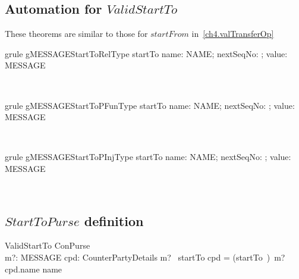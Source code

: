\subsection*{Automation for $ValidStartTo$}

These theorems are similar to those for $startFrom$ in~\ref{ch4.valTransferOp}
%
\begin{LGRT}
\begin{theorem}{grule gMESSAGEStartToRelType}
   startTo \in  \lblot name: NAME; nextSeqNo: \nat ; value: \nat \rblot  \rel  MESSAGE
\end{theorem}~\end{LGRT}

\begin{LGRT}
\begin{theorem}{grule gMESSAGEStartToPFunType}
   startTo \in  \lblot name: NAME; nextSeqNo: \nat ; value: \nat \rblot  \pfun  MESSAGE
\end{theorem}~\end{LGRT}

\begin{LGRT}
\begin{theorem}{grule gMESSAGEStartToPInjType}
   startTo \in \lblot name: NAME; nextSeqNo: \nat; value: \nat \rblot \pinj MESSAGE
\end{theorem}~\end{LGRT}

\subsection*{$StartToPurse$ definition}

\begin{LSDef}
\begin{schema}{ValidStartTo}
   ConPurse \\
   m?: MESSAGE
   \also
   cpd: CounterPartyDetails
\where
   m? \in \ran~startTo
   \also
   cpd = (startTo~\inv)~m?
   \also
   cpd.name \neq name
\end{schema}~\end{LSDef}

